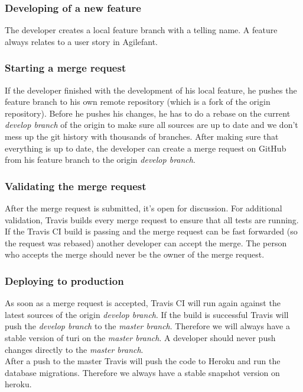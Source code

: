 \documentclass[a4paper]{article}
\begin{document}
\subsubsection{Developing of a new feature}
The developer creates a local feature branch with a telling name. A feature always relates to a user story in Agilefant.

\subsubsection{Starting a merge request}
If the developer finished with the development of his local feature, he pushes the feature branch to his own remote repository (which is a fork of the origin repository). Before he pushes his changes, he has to do a rebase on the current \textit{develop branch} of the origin to make sure all sources are up to date and we don't mess up the git history with thousands of branches. After making sure that everything is up to date, the developer can create a merge request on GitHub from his feature branch to the origin \textit{develop branch}.

\subsubsection{Validating the merge request}
After the merge request is submitted, it's open for discussion. For additional validation, Travis builds every merge request to ensure that all tests are running. If the Travis CI build is passing and the merge request can be fast forwarded (so the request was rebased) another developer can accept the merge. The person who accepts the merge should never be the owner of the merge request.

\subsubsection{Deploying to production}
As soon as a merge request is accepted, Travis CI will run again against the latest sources of the origin \textit{develop branch}. If the build is successful Travis will push the \textit{develop branch} to the \textit{master branch}. Therefore we will always have a stable version of turi on the \textit{master branch}. A developer should never push changes directly to the \textit{master branch}.\\

\noindent
After a push to the master Travis will push the code to Heroku and run the database migrations. Therefore we always have a stable snapshot version on heroku.
\end{document}
